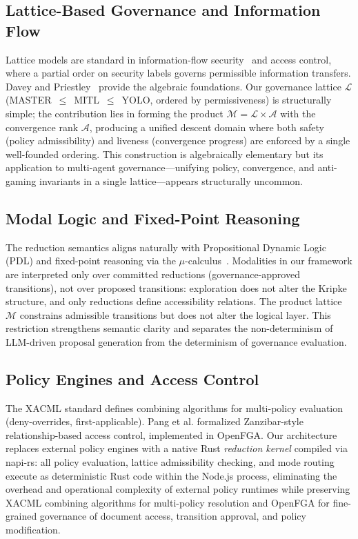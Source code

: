 \documentclass[11pt]{article}
\begin{document}
\subsection{Lattice-Based Governance and Information Flow}

Lattice models are standard in information-flow security~\cite{denning1976,bell1973} and access control, where a partial order on security labels governs permissible information transfers. Davey and Priestley~\cite{davey2002} provide the algebraic foundations. Our governance lattice $\mathcal{L}$ (MASTER~$\leq$~MITL~$\leq$~YOLO, ordered by permissiveness) is structurally simple; the contribution lies in forming the product $\mathcal{M} = \mathcal{L} \times \mathcal{A}$ with the convergence rank $\mathcal{A}$, producing a unified descent domain where both safety (policy admissibility) and liveness (convergence progress) are enforced by a single well-founded ordering. This construction is algebraically elementary but its application to multi-agent governance---unifying policy, convergence, and anti-gaming invariants in a single lattice---appears structurally uncommon.

\subsection{Modal Logic and Fixed-Point Reasoning}

The reduction semantics aligns naturally with Propositional Dynamic Logic (PDL) and fixed-point reasoning via the $\mu$-calculus~\cite{kozen1983}. Modalities in our framework are interpreted only over committed reductions (governance-approved transitions), not over proposed transitions: exploration does not alter the Kripke structure, and only reductions define accessibility relations. The product lattice $\mathcal{M}$ constrains admissible transitions but does not alter the logical layer. This restriction strengthens semantic clarity and separates the non-determinism of LLM-driven proposal generation from the determinism of governance evaluation.

\subsection{Policy Engines and Access Control}

The XACML standard \cite{xacml2013} defines combining algorithms for multi-policy evaluation (deny-overrides, first-applicable). Pang et al. \cite{pang2019} formalized Zanzibar-style relationship-based access control, implemented in OpenFGA. Our architecture replaces external policy engines with a native Rust \emph{reduction kernel} compiled via napi-rs: all policy evaluation, lattice admissibility checking, and mode routing execute as deterministic Rust code within the Node.js process, eliminating the overhead and operational complexity of external policy runtimes while preserving XACML combining algorithms for multi-policy resolution and OpenFGA for fine-grained governance of document access, transition approval, and policy modification.
\end{document}
